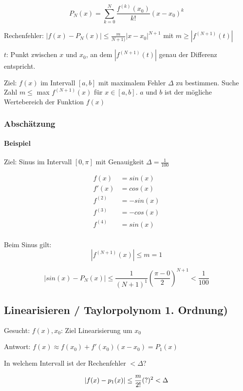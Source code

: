 \[
	P_N(x) = \sum^{N}_{k=0}{\frac{f^{(k)}(x_0)}{k!} (x-x_0)^k}
\]

Rechenfehler: $\left| f(x) - P_N(x) \right| \leq \frac{m}{N+1)} \left| x-x_0 \right|^{N+1}$ mit $m \geq \left| f^{(N+1)}(t) \right|$

$t$: Punkt zwischen $x$ und $x_0$, an dem $\left| f^{(N+1)}(t) \right|$ genau der Differenz entspricht.

Ziel: $f(x)$ im Intervall $[a,b]$ mit maximalem Fehler $\Delta$ zu bestimmen.
Suche Zahl $m \leq$ max $f^{(N+1)}(x)$ für $x \in [a,b]$. $a$ und $b$ ist der mögliche Wertebereich der Funktion $f(x)$

\subsubsection{Abschätzung}



\paragraph{Beispiel}

Ziel: Sinus im Intervall $[0, \pi]$ mit Genauigkeit $\Delta = \frac{1}{100}$

\begin{align*}
	f(x) &= sin(x) \\
	f'(x) &= cos(x) \\
	f^{(2)} &= -sin(x) \\
	f^{(3)} &= -cos(x) \\
	f^{(4)} &= sin(x) \\
\end{align*}

Beim Sinus gilt:
\[
	\left| f^{(N+1)}(x) \right| \leq m = 1
\]

\[
	\left| sin(x) - P_N(x) \right| \leq \frac{1}{(N+1)^1} \left(\frac{\pi-0}{2}\right)^{N+1} < \frac{1}{100}
\]

\subsection{Linearisieren / Taylorpolynom 1. Ordnung)}
Gesucht: $f(x), x_0$: Ziel Linearisierung um $x_0$

Antwort: $f(x) \approx f(x_0) + f'(x_0)(x-x_0) = P_1(x)$

In welchem Intervall ist der Rechenfehler $< \Delta$?

\[
	\left|f(x) - p_1(x) \right| \leq \frac{m}{2!}(?)^2 < \Delta \\
\]

